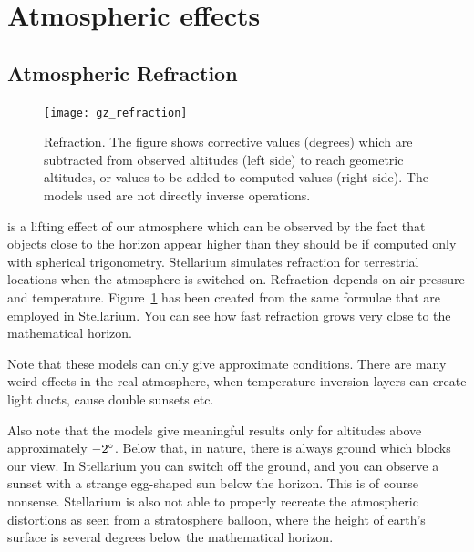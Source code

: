 \section{Atmospheric effects}
\label{sec:phenomena:Atmosphere}


\subsection{Atmospheric Refraction}
\label{sec:phenomena:Refraction}


\begin{figure}%
\centering\texttt{[image: gz\_refraction]}
\caption{Refraction. The figure shows corrective values (degrees)
  which are subtracted from observed altitudes (left side) to reach
  geometric altitudes, or values to be added to computed values (right
  side). The models used are not directly inverse operations.}
\label{fig:Refraction}
\end{figure}


 is a lifting effect of our
atmosphere which can be observed by the fact that objects close to the
horizon appear higher than they should be if computed only with
spherical trigonometry. Stellarium simulates refraction for
terrestrial locations when the atmosphere is switched on. Refraction
depends on air pressure and temperature. Figure~\ref{fig:Refraction}
has been created from the same formulae that are employed in
Stellarium. You can see how fast refraction grows very close to the
mathematical horizon.

Note that these models can only give approximate conditions. There are
many weird effects in the real atmosphere, when temperature inversion
layers can create light ducts, cause double sunsets etc.

Also note that the models give meaningful results only for altitudes
above approximately $-2\degree$. Below that, in nature, there is
always ground which blocks our view. In Stellarium you can switch off
the ground, and you can observe a sunset with a strange egg-shaped sun
below the horizon. This is of course nonsense. Stellarium is also not
able to properly recreate the atmospheric distortions as seen from a
stratosphere balloon, where the height of earth's surface is several
degrees below the mathematical horizon.

